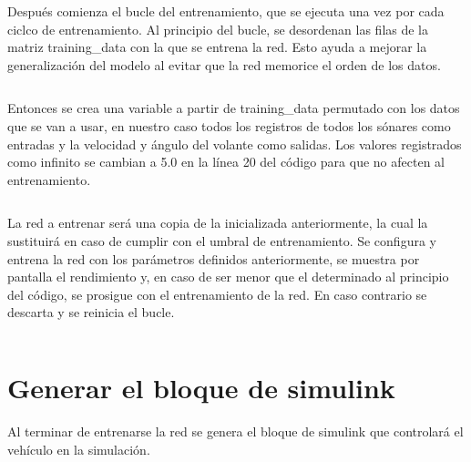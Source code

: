 \documentclass[a4paper, 12pt]{article}
\begin{document}
        \inputminted[fontsize=\scriptsize, linenos, breaklines=true, xleftmargin=0.75cm, frame=lines, firstline=0, lastline=6]{matlab}{code/control_neuronal.m}
    
        Después comienza el bucle del entrenamiento, que se ejecuta una vez por cada ciclco de entrenamiento. Al principio del bucle, se desordenan las filas de la matriz training\_data con la que se entrena la red. Esto ayuda a mejorar la generalización del modelo al evitar que la red memorice el orden de los datos.

        \inputminted[fontsize=\scriptsize, linenos, breaklines=true, xleftmargin=0.75cm, frame=lines, firstline=8, lastline=12]{matlab}{code/control_neuronal.m}

        Entonces se crea una variable a partir de training\_data permutado con los datos que se van a usar, en nuestro caso todos los registros de todos los sónares como entradas y la velocidad y ángulo del volante como salidas. Los valores registrados como infinito se cambian a 5.0 en la línea 20 del código para que no afecten al entrenamiento.

        \inputminted[fontsize=\scriptsize, linenos, breaklines=true, xleftmargin=0.75cm, frame=lines, firstline=14, lastline=22]{matlab}{code/control_neuronal.m}

        La red a entrenar será una copia de la inicializada anteriormente, la cual la sustituirá en caso de cumplir con el umbral de entrenamiento. Se configura y entrena la red con los parámetros definidos anteriormente, se muestra por pantalla el rendimiento y, en caso de ser menor que el determinado al principio del código, se prosigue con el entrenamiento de la red. En caso contrario se descarta y se reinicia el bucle.

        \inputminted[fontsize=\scriptsize, linenos, breaklines=true, xleftmargin=0.75cm, frame=lines, firstline=28, lastline=48]{matlab}{code/control_neuronal.m}
        
    \section{Generar el bloque de simulink}

        Al terminar de entrenarse la red se genera el bloque de simulink que controlará el vehículo en la simulación.
    
        \inputminted[fontsize=\scriptsize, linenos, breaklines=true, xleftmargin=0.75cm, frame=lines, firstline=50, lastline=51]{matlab}{code/control_neuronal.m}
    
\end{document}
